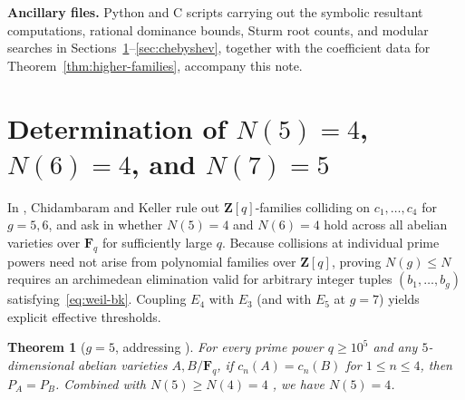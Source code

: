 \documentclass[11pt]{amsart}
\newtheorem{theorem}{Theorem}[section]
\theoremstyle{remark}
\newcommand{\F}{\mathbf{F}}
\newcommand{\Z}{\mathbf{Z}}
\begin{document}
\medskip\noindent\textbf{Ancillary files.}
Python and C scripts carrying out the symbolic resultant computations, rational dominance bounds, Sturm root counts, and modular searches in Sections~\ref{sec:small-g}--\ref{sec:chebyshev}, together with the coefficient data for Theorem~\ref{thm:higher-families}, accompany this note.

\section{Determination of \texorpdfstring{$N(5) = 4$, $N(6) = 4$, and $N(7) = 5$}{N(5) = 4, N(6) = 4, and N(7) = 5}}\label{sec:small-g}

In \cite[Example~7.7]{CK26}, Chidambaram and Keller rule out $\Z[q]$-families colliding on $c_1, \dots, c_4$ for $g = 5, 6$, and ask in \cite[Question~7.8]{CK26} whether $N(5) = 4$ and $N(6) = 4$ hold across all abelian varieties over $\F_q$ for sufficiently large $q$. Because collisions at individual prime powers need not arise from polynomial families over $\Z[q]$, proving $N(g) \le N$ requires an archimedean elimination valid for arbitrary integer tuples $(b_1, \dots, b_g)$ satisfying~\eqref{eq:weil-bk}. Coupling $E_4$ with $E_3$ (and with $E_5$ at $g = 7$) yields explicit effective thresholds.

\begin{theorem}[$g = 5$, addressing {\cite[Question~7.8]{CK26}}]\label{thm:g5}
For every prime power $q \ge 10^5$ and any $5$-dimensional abelian varieties $A, B / \F_q$, if $c_n(A) = c_n(B)$ for $1 \le n \le 4$, then $P_A = P_B$. Combined with $N(5) \ge N(4) = 4$ \cite[Section~7]{CK26}, we have $N(5) = 4$.
\end{theorem}
\end{document}
